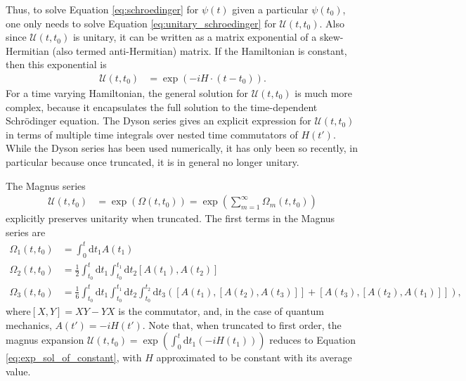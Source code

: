 \documentclass{jors}
\begin{document}
		Thus, to solve Equation \eqref{eq:schroedinger} for \(\psi(t)\) given a particular \(\psi(t_0)\), one only needs to solve Equation \eqref{eq:unitary_schroedinger} for \(\mathcal{U}(t, t_0)\).
		Also since \(\mathcal{U}(t, t_0)\) is unitary, it can be written as a matrix exponential of a skew-Hermitian (also termed anti-Hermitian) matrix.
		If the Hamiltonian is constant, then this exponential is %
		\begin{align}
			\mathcal{U}(t, t_0) &= \exp(-i H\cdot(t - t_0)).\label{eq:exp_sol_of_constant}
		\end{align}
		For a time varying Hamiltonian, the general solution for \(\mathcal{U}(t, t_0)\) is much more complex, because it encapsulates the full solution to the time-dependent Schr\"{o}dinger equation.
		The Dyson series gives an explicit expression for \(\mathcal{U}(t, t_0)\) in terms of multiple time integrals over nested time commutators of \(H(t')\). %
		While the Dyson series has been used numerically, it has only been so recently, in particular because once truncated, it is in general no longer unitary.

		The Magnus series
		\begin{align}
			\mathcal{U}(t, t_0) &= \exp\left(\Omega(t, t_0)\right) = \exp\left(\sum_{m = 1}^\infty \Omega_m(t, t_0)\right)
		\end{align}
		explicitly preserves unitarity when truncated\cite{magnus_exponential_1954}.
		The first terms in the Magnus series are\cite{blanes_magnus_2009}
		\begin{align}
			\Omega_1(t, t_0) &= \int_0^t\mathrm{d}t_1A(t_1)\\
			\Omega_2(t, t_0) &= \frac12\int_{t_0}^t\mathrm{d}t_1\int_{t_0}^{t_1}\mathrm{d}t_2[A(t_1), A(t_2)]\\
			\Omega_3(t, t_0) &= \frac16\int_{t_0}^t\mathrm{d}t_1\int_{t_0}^{t_1}\mathrm{d}t_2\int_{t_0}^{t_2}\mathrm{d}t_3\left([A(t_1), [A(t_2), A(t_3)]] + [A(t_3), [A(t_2), A(t_1)]]\right),
		\end{align}
		where\([X, Y] = XY - YX\) is the commutator, and, in the case of quantum mechanics, \(A(t') = -iH(t')\). Note that, when truncated to first order, the magnus expansion \(\mathcal{U}(t, t_0) = \exp\left(\int_0^t\mathrm{d}t_1\left(-iH(t_1)\right)\right)\) reduces to Equation \eqref{eq:exp_sol_of_constant}, with \(H\) approximated to be constant with its average value.
\end{document}
